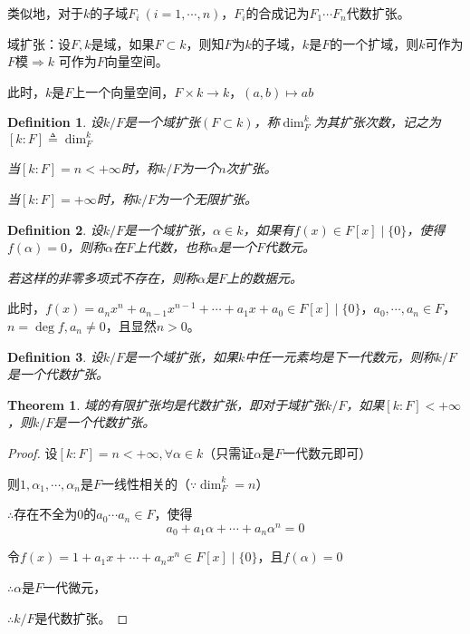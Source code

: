 \documentclass[UTF8]{article}
\newtheorem{thm}{Theorem}[section]
\newtheorem{defn}{Definition}[section]
\begin{document}
类似地，对于$k$的子域$F_i\ (i=1,\cdots, n)$，$F_i$的合成记为$F_1\cdots F_n$代数扩张。

域扩张：设$F, k$是域，如果$F\subset k$，则知$F$为$k$的子域，$k$是$F$的一个扩域，则$k$可作为$F$模$\Rightarrow k$ 可作为$F$向量空间。

此时，$k$是$F$上一个向量空间，$F \times k \longrightarrow k$，$(a, b) \longmapsto a b$

\begin{defn}
设$k/F$是一个域扩张$(F\subset k)$，称$\operatorname{dim}_F^k$为其扩张次数，记之为$\left[ k: F\right]\triangleq\operatorname{dim}_F^k$

\hspace{11pt}当$\left[ k: F\right]=n<+\infty$时，称$k/F$为一个$n$次扩张。

\hspace{11pt}当$\left[ k: F\right]=+\infty$时，称$k/F$为一个无限扩张。
\end{defn}

\begin{defn}
设$k/F$是一个域扩张，$\alpha\in k$，如果有$f(x)\in F[x] \mid\{ 0\}$，使得$f(\alpha)=0$，则称$\alpha$在$F$上代数，也称$\alpha$是一个$F$代数元。

若这样的非零多项式不存在，则称$\alpha$是$F$上的数据元。
\end{defn} 
此时，$f(x)=a_n x^{n}+a_{n-1} x^{n-1}+\cdots+a_{1} x+a_{0}\in F[x] \mid \{ 0\}$，$a_0,\cdots, a_n\in F$，$n=\operatorname{deg}f, a_n\neq 0$，且显然$n>0$。

\begin{defn}
设$k/F$是一个域扩张，如果$k$中任一元素均是下一代数元，则称$k/F$是一个代数扩张。
\end{defn}

\begin{thm}域的有限扩张均是代数扩张，即对于域扩张$k/F$，如果$[k: F]<+\infty$，则$k/F$是一个代数扩张。
\end{thm}
\begin{proof}
设$[k: F]=n<+\infty, \forall\alpha\in k$（只需证$\alpha$是$F$一代数元即可）

\hspace{11pt}则$1,\alpha_1,\cdots,\alpha_n$是$F$一线性相关的（$\because\operatorname{dim}_F^k=n$）

\hspace{11pt}$\therefore$存在不全为0的$a_0\cdots a_n\in F$，使得
$$
a_{0}+a_{1} \alpha+\cdots+a_n\alpha^{n}=0
$$

\hspace{11pt}令$f(x)=1+a_{1} x+\cdots+a_{n} x^{n}  \in  F[x] \mid \{0 \}$，且$f(\alpha)=0$

\hspace{11pt}$\therefore\alpha$是$F$一代微元，

\hspace{11pt}$\therefore k/F$是代数扩张。\end{proof}
\end{document}
